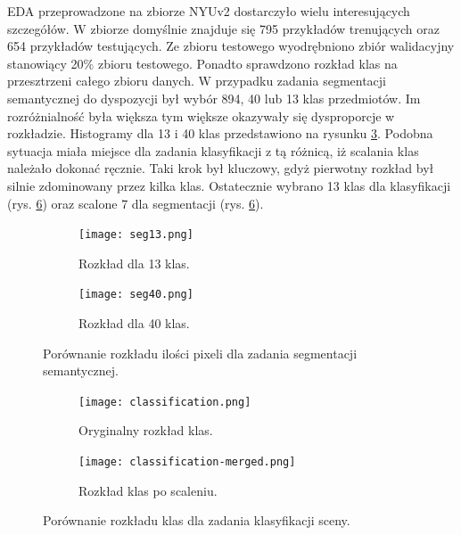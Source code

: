 EDA przeprowadzone na zbiorze NYUv2 dostarczyło wielu interesujących szczegółów. W zbiorze domyślnie znajduje się 795 przykładów trenujących oraz 654 przykładów testujących. Ze zbioru testowego wyodrębniono zbiór walidacyjny stanowiący 20\% zbioru testowego. Ponadto sprawdzono rozkład klas na przesztrzeni całego zbioru danych.
W przypadku zadania segmentacji semantycznej do dyspozycji był wybór 894, 40 lub 13 klas przedmiotów. Im rozróżnialność była większa tym większe okazywały się dysproporcje w rozkładzie. Histogramy dla 13 i 40 klas przedstawiono na rysunku \ref{fig:rozklad-segm}.
Podobna sytuacja miała miejsce dla zadania klasyfikacji z tą różnicą, iż scalania klas należało dokonać ręcznie. Taki krok był kluczowy, gdyż pierwotny rozkład był silnie zdominowany przez kilka klas.
Ostatecznie wybrano 13 klas dla klasyfikacji (rys. \ref{fig:7 klas dystrybucja}) oraz scalone 7 dla segmentacji (rys. \ref{fig:7 klas dystrybucja}).
\begin{figure}[ht!]
    \centering
    \begin{subfigure}[b]{0.49\textwidth}
        \centering
        \texttt{[image: seg13.png]}
        \caption{Rozkład dla 13 klas.}
        \label{fig:rozklad-13klas-seg}
    \end{subfigure}
    \hfill
    \begin{subfigure}[b]{0.49\textwidth}
        \centering
        \texttt{[image: seg40.png]}
        \caption{Rozkład dla 40 klas.}
        \label{fig:rozklad-40klas-seg}
    \end{subfigure}
    \caption[]{Porównanie rozkładu ilości pixeli dla zadania segmentacji semantycznej.}
    \label{fig:rozklad-segm}
\end{figure}
\begin{figure}
    \centering
    \begin{subfigure}[b]{0.49\textwidth}
        \centering
        \texttt{[image: classification.png]}
        \caption{Oryginalny rozkład klas.}
        \label{fig:27 klas dystrybucja}
    \end{subfigure}
    \hfill
    \begin{subfigure}[b]{0.49\textwidth}
        \centering
        \texttt{[image: classification-merged.png]}
        \caption{Rozkład klas po scaleniu.}
        \label{fig:7 klas dystrybucja}
    \end{subfigure}
    \caption[]{Porównanie rozkładu klas dla zadania klasyfikacji sceny.}
\end{figure}


